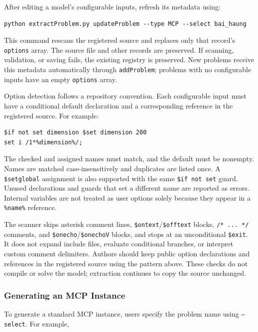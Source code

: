 After editing a model's configurable inputs, refresh its metadata using:

\begin{verbatim}
python extractProblem.py updateProblem --type MCP --select bai_haung
\end{verbatim}

This command rescans the registered source and replaces only that record's \texttt{options} array. The source file and other records are preserved. If scanning, validation, or saving fails, the existing registry is preserved. New problems receive this metadata automatically through \texttt{addProblem}; problems with no configurable inputs have an empty \texttt{options} array.

Option detection follows a repository convention. Each configurable input must have a conditional default declaration and a corresponding reference in the registered source. For example:

\begin{verbatim}
$if not set dimension $set dimension 200
set i /1*%dimension%/;
\end{verbatim}

The checked and assigned names must match, and the default must be nonempty. Names are matched case-insensitively and duplicates are listed once. A \texttt{\$setglobal} assignment is also supported with the same \texttt{\$if not set} guard. Unused declarations and guards that set a different name are reported as errors. Internal variables are not treated as user options solely because they appear in a \texttt{\%name\%} reference.

The scanner skips asterisk comment lines, \texttt{\$ontext}/\texttt{\$offtext} blocks, \texttt{/* ... */} comments, and \texttt{\$onecho}/\texttt{\$onechoV} blocks, and stops at an unconditional \texttt{\$exit}. It does not expand include files, evaluate conditional branches, or interpret custom comment delimiters. Authors should keep public option declarations and references in the registered source using the pattern above. These checks do not compile or solve the model; extraction continues to copy the source unchanged.

\subsubsection{Generating an MCP Instance}

To generate a standard MCP instance, users specify the problem name using \texttt{--select}. For example,

